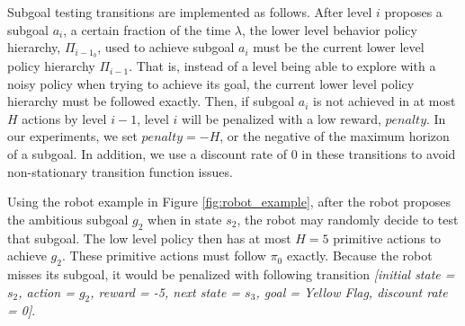 \documentclass{article} %
\begin{document}
Subgoal testing transitions are implemented as follows.  After level $i$ proposes a subgoal $a_i$, a certain fraction of the time $\lambda$, the lower level behavior policy hierarchy, $\Pi_{i-1_b}$, used to achieve subgoal $a_i$ must be the current lower level policy hierarchy $\Pi_{i-1}$.  That is, instead of a level being able to explore with a noisy policy when trying to achieve its goal, the current lower level policy hierarchy must be followed exactly.  Then, if subgoal $a_i$ is not achieved in at most $H$ actions by level $i-1$, level $i$ will be penalized with a low reward, $penalty$.  In our experiments, we set $penalty = -H$, or the negative of the maximum horizon of a subgoal.  In addition, we use a discount rate of 0 in these transitions to avoid non-stationary transition function issues. 

Using the robot example in Figure \ref{fig:robot_example}, after the robot proposes the ambitious subgoal $g_2$ when in state $s_2$, the robot may randomly decide to test that subgoal.  The low level policy then has at most $H=5$ primitive actions to achieve $g_2$.  These primitive actions must follow $\pi_0$ exactly.  Because the robot misses its subgoal, it would be penalized with following transition \textit{[initial state = $s_2$, action = $g_2$, reward = -5, next state = $s_3$, goal = Yellow Flag, discount rate = 0]}.     
\end{document}
